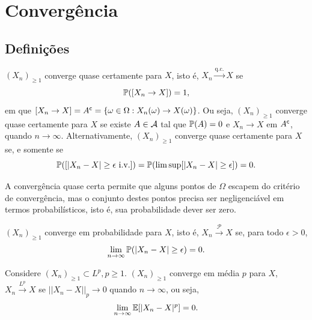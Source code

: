 \section{Convergência}

\subsection{Definições}

\begin{definition}
	\leavevmode
	\begin{outline}
		\1 $(X_n)_{\geq1}$ converge quase certamente para $X$, isto é, $X_n \xrightarrow{\text{q.c.}} X$ se
		\begin{equation}
			\P([X_n\to X])=1,
		\end{equation}
		em que $[X_n \to X] = \cp{A} = \{\omega \in \Omega: X_n(\omega) \to X(\omega) \}$.
		\1 Ou seja, $(X_n)_{\geq1}$ converge quase certamente para $X$ se existe $A\in\Acal$ tal que $\P(A)=0$ e $X_n\to X$ em $\cp{A}$, quando $n\to\infty$.
		\1  Alternativamente, $(X_n)_{\geq1}$ converge quase certamente para $X$ se, e somente se
		\begin{equation}
			\P([|X_n-X|\geq \epsilon \text{ i.v.}])= \P(\limsup[|X_n-X|\geq\epsilon])= 0.
		\end{equation}
	\end{outline}
	\begin{note}
		A convergência quase certa permite que alguns pontos de $\Omega$ escapem do critério de convergência, mas o conjunto destes pontos precisa ser negligenciável em termos probabilísticos, isto é, sua probabilidade dever ser zero.  
	\end{note}
	
\end{definition}

\begin{definition}[Em probabilidade]
	$(X_n)_{\geq1}$ converge em probabilidade para $X$, isto é, $X_n \xrightarrow{\mathcal{P}} X$ se, para todo $\epsilon>0$,
	\begin{equation}
		\lim\limits_{n\to\infty}\P(|X_n-X|\geq\epsilon)=0.
	\end{equation}
\end{definition}

\begin{definition}[Em média $p$]
	Considere $(X_n)_{\geq1} \subset L^p, p\geq1$. $(X_n)_{\geq1}$ converge em média $p$ para $X$, $X_n \xrightarrow{L ^p} X$ se $|| X_n-X ||_p\to 0$ quando $n\to\infty$, ou seja,
	\begin{equation}
		\lim\limits_{n\to\infty}\E[|X_n-X|^p]=0.
	\end{equation}
\end{definition}

